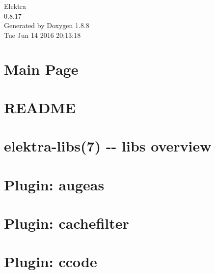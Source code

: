 \documentclass[twoside]{book}
\newcommand{\+}{\discretionary{\mbox{\scriptsize$\hookleftarrow$}}{}{}}
\newcommand{\clearemptydoublepage}{%
  \newpage{\pagestyle{empty}\cleardoublepage}%
}
\begin{document}
\hypersetup{pageanchor=false,
             bookmarks=true,
             bookmarksnumbered=true,
             pdfencoding=unicode
            }
\begin{titlepage}
\vspace*{7cm}
\begin{center}%
{\Large Elektra \\[1ex]\large 0.\+8.\+17 }\\
\vspace*{1cm}
{\large Generated by Doxygen 1.8.8}\\
\vspace*{0.5cm}
{\small Tue Jun 14 2016 20:13:18}\\
\end{center}
\end{titlepage}
\clearemptydoublepage
\tableofcontents
\clearemptydoublepage
{}
\hypersetup{pageanchor=true}

\chapter{Main Page}
\label{index}\hypertarget{index}{}
\chapter{R\+E\+A\+D\+M\+E}
\label{md_src_libs_getenv_README}
\hypertarget{md_src_libs_getenv_README}{}

\chapter{elektra-\/libs(7) -\/-\/ libs overview}
\label{md_src_libs_README}
\hypertarget{md_src_libs_README}{}

\chapter{Plugin\+: augeas}
\label{md_src_plugins_augeas_README}
\hypertarget{md_src_plugins_augeas_README}{}

\chapter{Plugin\+: cachefilter}
\label{md_src_plugins_cachefilter_README}
\hypertarget{md_src_plugins_cachefilter_README}{}

\chapter{Plugin\+: ccode}
\label{md_src_plugins_ccode_README}
\hypertarget{md_src_plugins_ccode_README}{}

\end{document}
